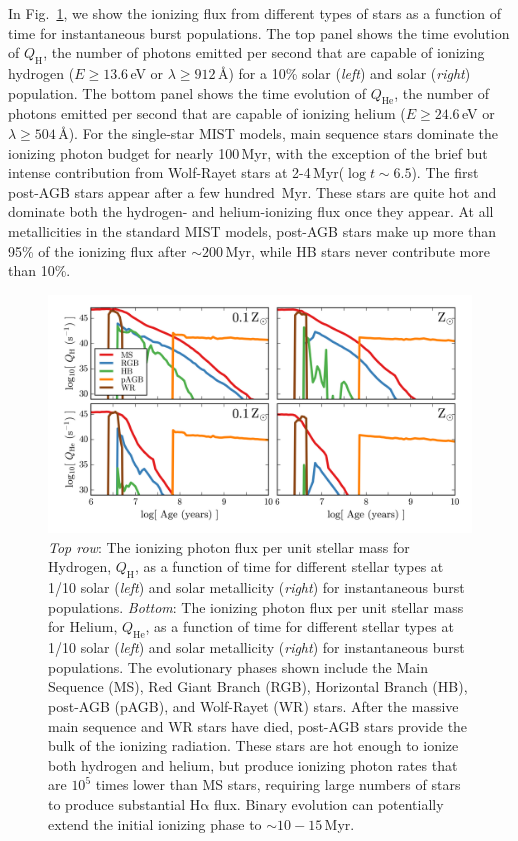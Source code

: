 \documentclass[preprint2]{aastex62}
\newcommand{\ha}{\ensuremath{\mathrm{H\alpha}}\xspace}
\newcommand{\ang}{\ensuremath{\mbox{\AA}}\xspace}
\newcommand{\QH}{\ensuremath{Q_{\mathrm{H}}}\xspace}
\newcommand{\QHe}{\ensuremath{Q_{\mathrm{He}}}\xspace}
\newcommand{\Myr}{$\,$Myr\xspace}
\begin{document}
In Fig.~\ref{fig:QF}, we show the ionizing flux from different types of stars as a function of time for instantaneous burst populations. The top panel shows the time evolution of \QH, the number of photons emitted per second that are capable of ionizing hydrogen ($E\geq13.6\,$eV or $\lambda \geq 912\,$\ang) for a 10\% solar (\emph{left}) and solar (\emph{right}) population. The bottom panel shows the time evolution of \QHe, the number of photons emitted per second that are capable of ionizing helium ($E\geq24.6\,$eV or $\lambda \geq 504\,$\ang). For the single-star MIST models, main sequence stars dominate the ionizing photon budget for nearly 100\Myr, with the exception of the brief but intense contribution from Wolf-Rayet stars at 2-4\Myr ($\log t\sim6.5$). The first post-AGB stars appear after a few hundred \Myr. These stars are quite hot and dominate both the hydrogen- and helium-ionizing flux once they appear. At all metallicities in the standard MIST models, post-AGB stars make up more than 95\% of the ionizing flux after $\sim200$\Myr, while HB stars never contribute more than 10\%.
\begin{figure}
  \begin{center}
    \includegraphics[width=\linewidth]{figs/f3.png}
    \caption{\emph{Top row}: The ionizing photon flux per unit stellar mass for Hydrogen, \QH, as a function of time for different stellar types at 1/10 solar (\emph{left}) and solar metallicity (\emph{right}) for instantaneous burst populations. \emph{Bottom}: The ionizing photon flux per unit stellar mass for Helium, \QHe, as a function of time for different stellar types at 1/10 solar (\emph{left}) and solar metallicity (\emph{right}) for instantaneous burst populations. The evolutionary phases shown include the Main Sequence (MS), Red Giant Branch (RGB), Horizontal Branch (HB), post-AGB (pAGB), and Wolf-Rayet (WR) stars. After the massive main sequence and WR stars have died, post-AGB stars provide the bulk of the ionizing radiation. These stars are hot enough to ionize both hydrogen and helium, but produce ionizing photon rates that are $10^5$ times lower than MS stars, requiring large numbers of stars to produce substantial \ha flux. Binary evolution can potentially extend the initial ionizing phase to $\sim10-15$\Myr.}
    \label{fig:QF}
  \end{center}
\end{figure}
\end{document}
